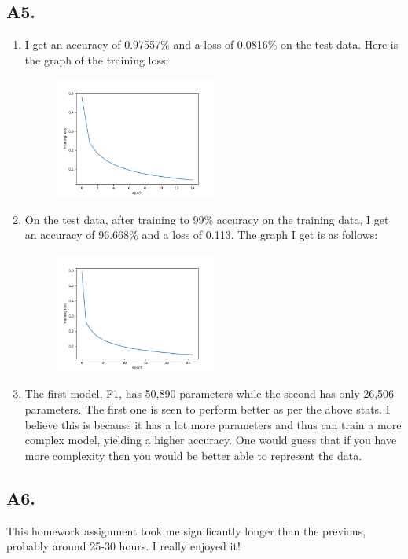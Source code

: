 \documentclass[12pt]{article}
\theoremstyle{definitionstyle}
\begin{document}
    \subsection*{A5.}
    \begin{enumerate}[label=(\alph*)]
        \item I get an accuracy of 0.97557\% and a loss of 0.0816\% on the test data. Here is the graph of the training loss:
        \begin{figure}[H]
            \centering
            \includegraphics[width=0.5\textwidth]{F1_training_loss.png}
        \end{figure}
        \item On the test data, after training to 99\% accuracy on the training data, I get an accuracy of 96.668\% and a loss of 0.113. The graph I get is as follows:
        \begin{figure}[H]
            \centering
            \includegraphics[width=0.5\textwidth]{F2_training_loss.png}
        \end{figure}

        \item The first model, F1, has 50,890 parameters while the second has only 26,506 parameters. The first one is seen to perform better as per the above stats. I believe this is because it has a lot more parameters and thus can train a more complex model, yielding a higher accuracy. One would guess that if you have more complexity then you would be better able to represent the data.
    \end{enumerate}

    \subsection*{A6.}
    This homework assignment took me significantly longer than the previous, probably around 25-30 hours. I really enjoyed it!
\end{document}
